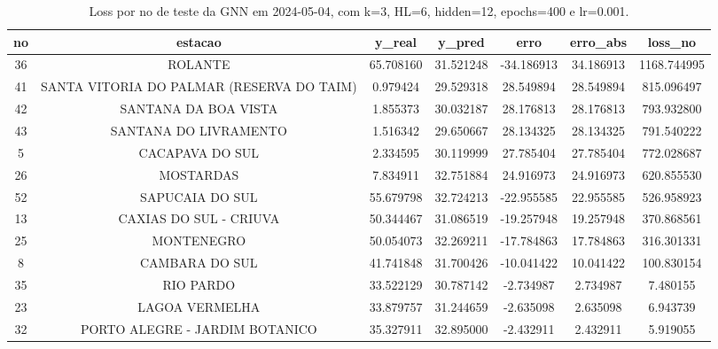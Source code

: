 \begin{table}[h]
\centering
\caption{Loss por no de teste da GNN em 2024-05-04, com k=3, HL=6, hidden=12, epochs=400 e lr=0.001.}
\label{tab:gnn_loss_k3_hl6_h12_e400_d20240504}
\begin{tabular}{ccccccc}
\toprule
no & estacao & y\_real & y\_pred & erro & erro\_abs & loss\_no \\
\midrule
36 & ROLANTE & 65.708160 & 31.521248 & -34.186913 & 34.186913 & 1168.744995 \\
41 & SANTA VITORIA DO PALMAR (RESERVA DO TAIM) & 0.979424 & 29.529318 & 28.549894 & 28.549894 & 815.096497 \\
42 & SANTANA DA BOA VISTA & 1.855373 & 30.032187 & 28.176813 & 28.176813 & 793.932800 \\
43 & SANTANA DO LIVRAMENTO & 1.516342 & 29.650667 & 28.134325 & 28.134325 & 791.540222 \\
5 & CACAPAVA DO SUL & 2.334595 & 30.119999 & 27.785404 & 27.785404 & 772.028687 \\
26 & MOSTARDAS & 7.834911 & 32.751884 & 24.916973 & 24.916973 & 620.855530 \\
52 & SAPUCAIA DO SUL & 55.679798 & 32.724213 & -22.955585 & 22.955585 & 526.958923 \\
13 & CAXIAS DO SUL - CRIUVA & 50.344467 & 31.086519 & -19.257948 & 19.257948 & 370.868561 \\
25 & MONTENEGRO & 50.054073 & 32.269211 & -17.784863 & 17.784863 & 316.301331 \\
8 & CAMBARA DO SUL & 41.741848 & 31.700426 & -10.041422 & 10.041422 & 100.830154 \\
35 & RIO PARDO & 33.522129 & 30.787142 & -2.734987 & 2.734987 & 7.480155 \\
23 & LAGOA VERMELHA & 33.879757 & 31.244659 & -2.635098 & 2.635098 & 6.943739 \\
32 & PORTO ALEGRE - JARDIM BOTANICO & 35.327911 & 32.895000 & -2.432911 & 2.432911 & 5.919055 \\
\bottomrule
\end{tabular}
\end{table}
